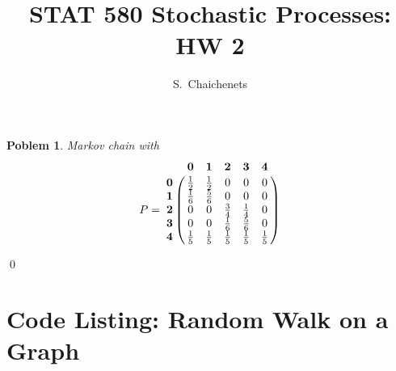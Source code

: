 \documentclass[8pt,notitlepage]{report}
\newtheorem{problem}{Poblem}
\newenvironment{solution}[1][Solution]{\begin{trivlist}
    \item[\hskip \labelsep {\bfseries #1}]}{\end{trivlist}}
\begin{document}
\title{STAT 580 Stochastic Processes: HW 2}
\author{ S.\ Chaichenets }
\maketitle



\begin{problem}
Markov chain with 
\small
\begin{equation}
P = 
\bordermatrix{
	& \mathbf{0} & \mathbf{1} & \mathbf{2} & \mathbf{3} & \mathbf{4} \cr
\mathbf{0} &  \frac{1}{2} & \frac{1}{2} & 0 & 0 & 0 \cr
\mathbf{1} &  \frac{1}{6} & \frac{5}{6} & 0 & 0 & 0 \cr
\mathbf{2} &  0 & 0 & \frac{3}{4} & \frac{1}{4} & 0 \cr
\mathbf{3} &  0 & 0 & \frac{1}{6} & \frac{5}{6} & 0 \cr
\mathbf{4} &  \frac{1}{5} & \frac{1}{5} & \frac{1}{5} & \frac{1}{5} & \frac{1}{5} \cr
}
\end{equation}
\normalsize


\end{problem}

\begin{solution}

\qed
\end{solution}

\newpage
\appendix
\section*{Code Listing: Random Walk on a Graph}

\end{document}
